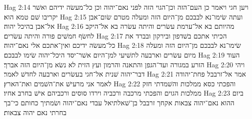 Hag 2:14  ויען חגי ויאמר כן העם־הזה וכן־הגוי הזה לפני נאם־יהוה וכן כל־מעשׂה ידיהם ואשׁר יקריבו שׁם טמא הוא׃
Hag 2:15  ועתה שׂימו־נא לבבכם מן־היום הזה ומעלה מטרם שׂום־אבן אל־אבן בהיכל יהוה׃
Hag 2:16  מהיותם בא אל־ערמת עשׂרים והיתה עשׂרה בא אל־היקב לחשׂף חמשׁים פורה והיתה עשׂרים׃
Hag 2:17  הכיתי אתכם בשׁדפון ובירקון ובברד את כל־מעשׂה ידיכם ואין־אתכם אלי נאם־יהוה׃
Hag 2:18  שׂימו־נא לבבכם מן־היום הזה ומעלה מיום עשׂרים וארבעה לתשׁיעי למן־היום אשׁר־יסד היכל־יהוה שׂימו לבבכם׃
Hag 2:19  העוד הזרע במגורה ועד־הגפן והתאנה והרמון ועץ הזית לא נשׂא מן־היום הזה אברך׃
Hag 2:20  ויהי דבר־יהוה שׁנית אל־חגי בעשׂרים וארבעה לחדשׁ לאמר׃
Hag 2:21  אמר אל־זרבבל פחת־יהודה לאמר אני מרעישׁ את־השׁמים ואת־הארץ׃
Hag 2:22  והפכתי כסא ממלכות והשׁמדתי חזק ממלכות הגוים והפכתי מרכבה ורכביה וירדו סוסים ורכביהם אישׁ בחרב אחיו׃
Hag 2:23  ביום ההוא נאם־יהוה צבאות אקחך זרבבל בן־שׁאלתיאל עבדי נאם־יהוה ושׂמתיך כחותם כי־בך בחרתי נאם יהוה צבאות׃


